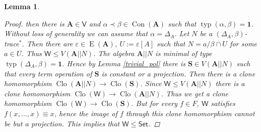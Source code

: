 \documentclass{amsart}
\theoremstyle{plain}
\newtheorem{lemma}[theorem]{Lemma}
\theoremstyle{definition}
\theoremstyle{remark}
\def\epsilon{\varepsilon}
\DeclareMathOperator{\Clo}{Clo}
\DeclareMathOperator{\Con}{Con}
\DeclareMathOperator{\typ}{typ}
\DeclareMathOperator{\Id}{E}
\begin{document}
\begin{lemma}
\begin{proof}
        then there is $\mathbf{A} \in \mathsf{V}$ and $\alpha \prec \beta \in \Con(\mathbf{A})$ such that $\typ(\alpha, \beta) =\mathbf{1}$. 
        Without loss of generality we can assume that $\alpha = \Delta_A$. 
        Let $N$ be a $(\Delta_A, \beta)$-trace$^{*}$.
        Then there are $\epsilon \in \Id(\mathbf{A})$, $U:=\epsilon[A]$ such that $N = a /\beta \cap U$ for some $a \in U$. 
        Thus $\mathsf{W} \le V(\mathbf{A}||N)$. 
        The algebra $\mathbf{A}||N$ is minimal of type $\typ(\Delta_A,\beta)=\mathbf{1}$. 
        Hence by Lemma \ref{trivial_pol}
        there is $\mathbf{S} \in V(\mathbf{A}||N)$ such that every term operation of $\mathbf{S}$ is constant or a projection. 
        Then there is a clone homomorphism $\Clo(\mathbf{A}||N) \to \Clo(\mathbf{S})$.
        Since $\mathsf{W} \le V(\mathbf{A}||N)$ there is a clone homomorphism $\Clo(\mathsf{W}) \to \Clo(\mathbf{A}||N)$. 
        Thus we get a clone homomorphism $\Clo(\mathsf{W}) \to \Clo(\mathbf{S})$. 
        But for every $f \in F$, $\mathsf{W}$ satisfies $f(x, \ldots, x) \equiv x$, hence the image of $f$ through this clone homomorphism cannot be but a projection. 
        This implies that $\mathsf{W} \le \mathsf{Set}$. 
    \end{proof}
\end{lemma}
\end{document}
